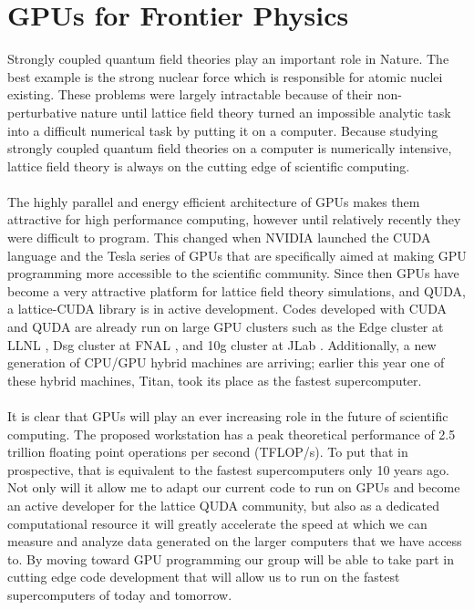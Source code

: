 \documentclass[11pt]{article}
\begin{document}
  \section*{GPUs for Frontier Physics}
  Strongly coupled quantum field theories play an important role in Nature.
  The best example is the strong nuclear force which is responsible for atomic nuclei existing.
  These problems were largely intractable because of their non-perturbative nature until lattice field theory turned an impossible analytic task into a difficult numerical task by putting it on a computer.
  Because studying strongly coupled quantum field theories  on a computer is numerically intensive, lattice field theory is always on the cutting edge of scientific computing. \\\\
 The highly parallel and energy efficient architecture of GPUs makes them attractive for high performance computing, however until relatively recently they were difficult to program.  
 This changed when NVIDIA launched the CUDA language and the Tesla series of GPUs that are specifically aimed at making GPU programming more accessible to the scientific community.
  Since then GPUs have become a very attractive platform for lattice field theory simulations, and QUDA, a lattice-CUDA library \cite{QUDA1,QUDA2,QUDA3} is in active development.
   Codes developed with CUDA and QUDA are already run on large GPU clusters such as the Edge cluster at LLNL \cite{Edge}, Dsg cluster at FNAL \cite{Dsg}, and 10g cluster at JLab \cite{10g}.
  Additionally, a new generation of CPU/GPU hybrid machines are arriving; earlier this year one of these hybrid machines, Titan, took its place as the fastest supercomputer.\\\\
  It is clear that GPUs will play an ever increasing role in the future of scientific computing. 
  The proposed workstation has a peak theoretical performance of 2.5 trillion floating point operations per second (TFLOP/s).
  To put that in prospective, that is equivalent to the fastest supercomputers only 10 years ago.
  Not only will it allow me to adapt our current code to run on GPUs and become an active developer for the lattice QUDA community, but also as a dedicated computational resource it will greatly accelerate the speed at which we can measure and analyze data generated on the larger computers that we have access to.
  By moving toward GPU programming our group will be able to take part in cutting edge code development that will allow us to run on the fastest supercomputers of today and tomorrow.
    
\end{document}
